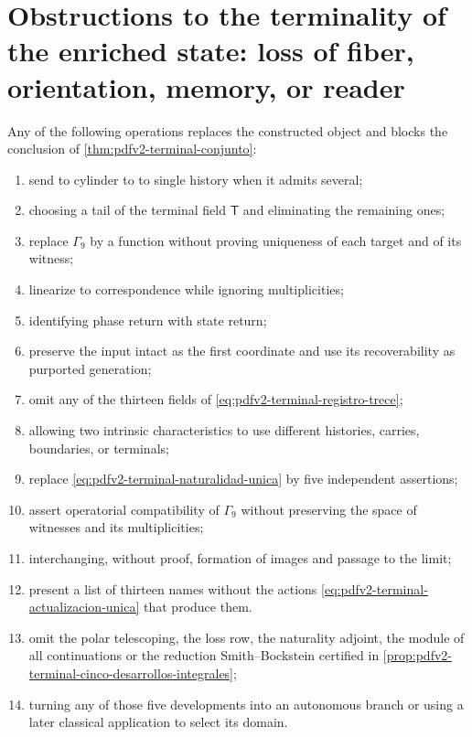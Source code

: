 \section{Obstructions to the terminality of the enriched state: loss of fiber, orientation, memory, or reader}

\begin{proposition}
\label{prop:pdfv2-terminal-falsadores}
Any of the following operations replaces the constructed object and
blocks the conclusion of
\cref{thm:pdfv2-terminal-conjunto}:
\begin{enumerate}
 \item send to cylinder to to single history when it admits several;
 \item choosing a tail of the terminal field \(\mathsf T\) and eliminating the
       remaining ones;
 \item replace \(\Gamma_9\) by a function without proving uniqueness of
       each target and of its witness;
 \item linearize to correspondence while ignoring multiplicities;
 \item identifying phase return with state return;
 \item preserve the input intact as the first coordinate and use its
       recoverability as purported generation;
 \item omit any of the thirteen fields of
       \eqref{eq:pdfv2-terminal-registro-trece};
 \item allowing two intrinsic characteristics to use different histories,
       carries, boundaries, or terminals;
 \item replace
       \eqref{eq:pdfv2-terminal-naturalidad-unica} by five independent
       assertions;
 \item assert operatorial compatibility of \(\Gamma_9\) without preserving the
       space of witnesses and its multiplicities;
 \item interchanging, without proof, formation of images and passage to the limit;
 \item present a list of thirteen names without the actions
       \eqref{eq:pdfv2-terminal-actualizacion-unica} that produce them.
 \item omit the polar telescoping, the loss row, the naturality
       adjoint, the module of all continuations or the reduction
       Smith--Bockstein certified in
       \cref{prop:pdfv2-terminal-cinco-desarrollos-integrales};
 \item turning any of those five developments into an autonomous branch
       or using a later classical application to select its domain.
\end{enumerate}
\end{proposition}

